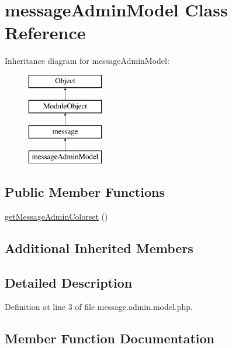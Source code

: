 \hypertarget{classmessageAdminModel}{}\section{message\+Admin\+Model Class Reference}
\label{classmessageAdminModel}
Inheritance diagram for message\+Admin\+Model\+:\begin{figure}[H]
\begin{center}
\leavevmode
\includegraphics[height=4.000000cm]{classmessageAdminModel}
\end{center}
\end{figure}
\subsection*{Public Member Functions}
\begin{DoxyCompactItemize}
\item 
\hyperlink{classmessageAdminModel_a97194ea5740d5de8b20b63c3c0bd9b90}{get\+Message\+Admin\+Colorset} ()
\end{DoxyCompactItemize}
\subsection*{Additional Inherited Members}


\subsection{Detailed Description}


Definition at line 3 of file message.\+admin.\+model.\+php.



\subsection{Member Function Documentation}
\hypertarget{classmessageAdminModel_a97194ea5740d5de8b20b63c3c0bd9b90}{}\label{classmessageAdminModel_a97194ea5740d5de8b20b63c3c0bd9b90} 
